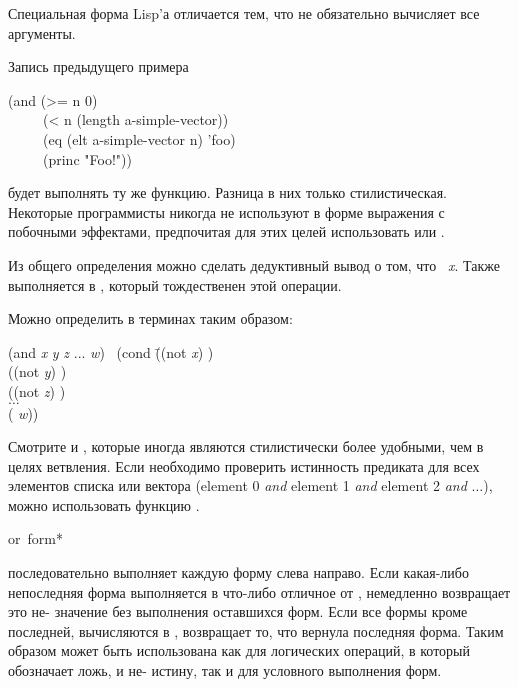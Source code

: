 \begin{defun}[Функция]
\begin{defmac}
Специальная форма Lisp'а  отличается тем, что не
обязательно вычисляет все аргументы.

Запись предыдущего примера
\begin{lisp}
(and (>= n 0) \\
~~~~~(< n (length a-simple-vector)) \\
~~~~~(eq (elt a-simple-vector n) 'foo) \\
~~~~~(princ "Foo!"))
\end{lisp}
будет выполнять ту же функцию. Разница в них только стилистическая. Некоторые
программисты никогда не используют в форме  выражения с побочными
эффектами, предпочитая для этих целей использовать  или . 

Из общего определения можно сделать дедуктивный вывод о том, что 
 \EQ\ \emph{x}. Также  выполняется в {\true},
который тождественен этой операции.

Можно определить  в терминах  таким образом:
\begin{lisp}
(and \emph{x} \emph{y} \emph{z} ... \emph{w}) \EQ\ (cond \=((not \emph{x}) {\false}) \\
\>((not \emph{y}) {\false}) \\
\>((not \emph{z}) {\false}) \\
\>$\ldots$ \\
\>({\true} \emph{w}))
\end{lisp}

Смотрите  и , которые иногда являются стилистически более
удобными, чем  в целях ветвления.
Если необходимо проверить истинность предиката для всех элементов списка или
вектора (element 0 \emph{and} element 1 \emph{and}
element 2 \emph{and} $\ldots$), можно использовать функцию .
\end{defmac}

\begin{defmac}
or {\,form}*

 последовательно выполняет каждую
форму слева направо. Если какая-либо непоследняя форма выполняется в что-либо
отличное от {\false},  немедленно возвращает это не-{\false} значение
без выполнения оставшихся форм. Если все формы кроме последней, вычисляются в
{\false},  возвращает то, что вернула последняя форма.
Таким образом  может быть использована как для логических операций, 
в который {\false} обозначает ложь, и не-{\false} истину,
так и для условного выполнения форм.


\end{defmac}
\end{defun}
